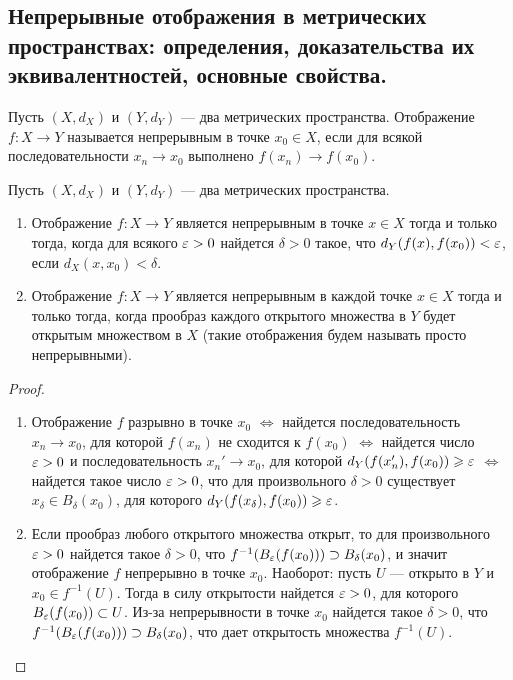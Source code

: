 \documentclass[a4paper]{article}
\theoremstyle{named}
\begin{document}
    \subsection{Непрерывные отображения в метрических пространствах: определения, доказательства их эквивалентностей, основные свойства.}

    \begin{definition*}
        Пусть $(X, d_X)$ и $(Y, d_Y)$ --- два метрических пространства. Отображение $f: X \to Y$ называется непрерывным в точке $x_0 \in X$, если для всякой последовательности $x_n \to x_0$ выполнено $f(x_n) \to f(x_0)$.
    \end{definition*}

    \begin{lemma*}
        Пусть $(X, d_X)$ и $(Y, d_Y)$ --- два метрических пространства.
        \begin{enumerate}
        \item
            Отображение $f: X \to Y$ является непрерывным в точке $x \in X$ тогда и только тогда, когда для всякого $\varepsilon > 0$ найдется $\delta > 0$ такое, что $d_Y(f(x), f(x_0)) < \varepsilon$, если $d_X(x, x_0) < \delta$.

        \item
            Отображение $f: X \to Y$ является непрерывным в каждой точке $x \in X$ тогда и только тогда, когда прообраз каждого открытого множества в $Y$ будет открытым множеством в $X$ (такие отображения будем называть просто непрерывными).
        \end{enumerate}
    \end{lemma*}

    \begin{proof}
        ~

        \begin{enumerate}
        \item
            Отображение $f$ разрывно в точке $x_0$ $\iff$ найдется последовательность $x_n \to x_0$, для которой $f(x_n)$ не сходится к $f(x_0)$ $\iff$ найдется число $\varepsilon > 0$ и последовательность $x_n' \to x_0$, для которой $d_Y(f(x_n'), f(x_0)) \geqslant \varepsilon$ $\iff$ найдется такое число $\varepsilon > 0$, что для произвольного $\delta > 0$ существует $x_{\delta} \in B_{\delta}(x_0)$, для которого $d_Y(f(x_\delta), f(x_0)) \geqslant \varepsilon$.

        \item
            Если прообраз любого открытого множества открыт, то для произвольного $\varepsilon > 0$ найдется такое $\delta > 0$, что $f^{-1}(B_{\varepsilon}(f(x_0))) \supset B_{\delta}(x_0)$, и значит отображение $f$ непрерывно в точке $x_0$. Наоборот: пусть $U$ --- открыто в $Y$ и $x_0 \in f^{-1}(U)$. Тогда в силу открытости найдется $\varepsilon > 0$, для которого $B_{\varepsilon}(f(x_0)) \subset U$. Из-за непрерывности в точке $x_0$ найдется такое $\delta > 0$, что $f^{-1}(B_{\varepsilon}(f(x_0))) \supset B_{\delta}(x_0)$, что дает открытость множества $f^{-1}(U)$.
        \end{enumerate} 
    \end{proof}
\end{document}
